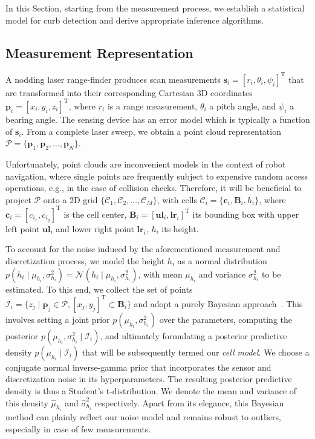In this Section, starting from the measurement process, we establish a
statistical model for curb detection and derive appropriate inference
algorithms.

\subsection{Measurement Representation}
A nodding laser range-finder produces scan measurements $\mathbf{s}_i=[r_i,
\theta_i,\psi_i]^\text{T}$ that are transformed into their corresponding
Cartesian 3D coordinates $\mathbf{p}_i=[x_i,y_i,z_i]^\text{T}$, where $r_i$ is
a range measurement, $\theta_i$ a pitch angle, and $\psi_i$ a bearing angle. The
sensing device has an error model which is typically a function of
$\mathbf{s}_i$. From a complete laser sweep, we obtain a point cloud
representation $\mathcal{P}=\{\mathbf{p}_1,\mathbf{p}_2,\dots,\mathbf{p}_N\}$.

Unfortunately, point clouds are inconvenient models in the context of robot
navigation, where single points are frequently subject to expensive random
access operations, e.g., in the case of collision checks. Therefore, it will be
beneficial to project $\mathcal{P}$ onto a 2D grid
$\{\mathcal{C}_1,\mathcal{C}_2,\dots,\mathcal{C}_M\}$, with cells
$\mathcal{C}_i=\{\mathbf{c}_i,\mathbf{B}_i,h_i\}$, where
$\mathbf{c}_i=[c_{i_x},c_{i_y}]^\text{T}$ is the cell center,
$\mathbf{B}_i=[\mathbf{ul}_i, \mathbf{lr}_i]^\text{T}$ its bounding box with
upper left point $\mathbf{ul}_i$ and lower right point $\mathbf{lr}_i$, $h_i$
its height.

To account for the noise induced by the aforementioned measurement and
discretization process, we model the height $h_i$ as a normal distribution
$p(h_i\mid\mu_{h_i},\sigma^2_{h_i})=\mathcal{N}(h_i\mid\mu_{h_i},
\sigma^2_{h_i})$, with mean $\mu_{h_i}$ and variance $\sigma^2_{h_i}$ to be
estimated. To this end, we collect the set of points $\mathcal{I}_i=\{z_j\mid
\mathbf{p}_j\in\mathcal{P}, [x_j,y_j]^\text{T}\subset\mathbf{B}_i\}$ and adopt a
purely Bayesian approach~\cite{gelman03bayesian}. This involves setting a joint
prior $p(\mu_{h_i},\sigma^2_{h_i})$ over the parameters, computing the
posterior $p(\mu_{h_i},\sigma^2_{h_i}\mid\mathcal{I}_i)$, and ultimately
formulating a posterior predictive density $p(\mu_{h_i}\mid\mathcal{I}_i)$ that
will be subsequently termed our \emph{cell model}. We choose a conjugate
normal inverse-gamma prior that incorporates the sensor and discretization noise
in its hyperparameters. The resulting posterior predictive density is thus a
Student's t-distribution. We denote the mean and variance of this density
$\hat{\mu}_{h_i}$ and $\hat{\sigma}^2_{h_i}$ respectively. Apart from its
elegance, this Bayesian method can plainly reflect our noise model and remains
robust to outliers, especially in case of few measurements.

